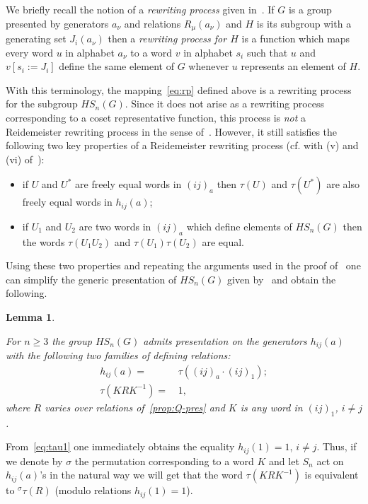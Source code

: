 \documentclass[oneside, 12pt]{amsart}
\theoremstyle{plain}
\numberwithin{equation}{section}
\newtheorem{lemma}{Lemma}
\numberwithin{lemma}{section}
\theoremstyle{remark}
\theoremstyle{definition}
\begin{document}
We briefly recall the notion of a {\it rewriting process} given in~\cite[\S~2.3]{MKS76}.
If $G$ is a group presented by generators $a_\nu$ and relations $R_{\mu}(a_{\nu})$ and $H$ is its subgroup with a generating set $J_i(a_\nu)$ then
 a {\it rewriting process for $H$} is a function which maps every word $u$ in alphabet $a_\nu$ to a word $v$ in alphabet $s_i$ such that
 $u$ and $v[s_i:=J_i]$ define the same element of $G$ whenever $u$ represents an element of $H$.

With this terminology, the mapping~\eqref{eq:rp} defined above is a rewriting process for the subgroup $HS_n(G)$.
Since it does not arise as a rewriting process corresponding to a coset representative function,
this process is {\it not} a Reidemeister rewriting process in the sense of~\cite[\S~2.3]{MKS76}.
However, it still satisfies the following two key properties of a Reidemeister rewriting process (cf. with (v) and (vi) of~\cite[\S~2.3]{MKS76}): 
\begin{itemize}
 \item if $U$ and $U^*$ are freely equal words in $(ij)_a$ then $\tau(U)$ and $\tau(U^*)$ are also freely equal words in $h_{ij}(a)$;
 \item if $U_1$ and $U_2$ are two words in $(ij)_a$ which define elements of $HS_n(G)$ then the words $\tau(U_1U_2)$ and $\tau(U_1) \tau(U_2)$ are equal.
\end{itemize}
Using these two properties and repeating the arguments used in the proof of~\cite[Theorem~2.8]{MKS76}
one can simplify the generic presentation of $HS_n(G)$ given by~\cite[Theorem~2.6]{MKS76} and obtain the following.
\begin{lemma} \label{lm:h-gen}

 For $n\geq 3$ the group $HS_n(G)$ admits presentation on the generators $h_{ij}(a)$ with the following two families of defining relations:
 \begin{align}
  h_{ij}(a) = &\, \tau\left((ij)_a \cdot (ij)_1\right); \label{eq:tau1} \\
  \tau(KRK^{-1}) = &\, 1, \label{eq:tau2} 
 \end{align}  
 where $R$ varies over relations of~\cref{prop:Q-pres} and $K$ is any word in $(ij)_1$, $i\neq j$.
\end{lemma}

From~\eqref{eq:tau1} one immediately obtains the equality $h_{ij}(1)=1$, $i\neq j$.
Thus, if we denote by $\sigma$ the permutation corresponding to a word $K$ and let $S_n$ act on $h_{ij}(a)$'s in the natural way
 we will get that the word $\tau(KRK^{-1})$ is equivalent to ${}^{\sigma}\tau(R)$ (modulo relations $h_{ij}(1)=1$). 
\end{document}
